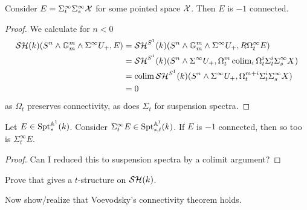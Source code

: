 \documentclass{amsart}%
\begin{document}
\begin{lemma}
  Consider $ E =\Sigma_t^{\infty}\Sigma_s^{\infty} \mathcal{X}$ for some pointed
  space $\mathcal{X}$. Then $E$ is $-1$ connected. 
\end{lemma}

\begin{proof}
  We calculate for $n<0$
  \begin{align*}
    \mathcal{SH}(k)(S^n\wedge\mathbb{G}_m^m \wedge \Sigma^{\infty}U_+, E) & = \mathcal{SH}^{S^1}(k)(S^n\wedge \mathbb{G}_m^m \wedge \Sigma^{\infty}U_+, R\Omega^{\infty}_tE) \\
    & = \mathcal{SH}^{S^1}(k)(S^n \wedge \Sigma^{\infty}U_+, \Omega_t^{m} \operatorname{colim}_i \Omega_t^i\Sigma_t^i \Sigma_s^{\infty} X)\\
    & = \operatorname{colim} \mathcal{SH}^{S^1}(k)(S^n \wedge \Sigma^{\infty}U_+, \Omega_t^{m+i}\Sigma_t^i \Sigma_s^{\infty} X)\\
      & = 0
  \end{align*}
  as $\Omega_t$ preserves connectivity, as does $\Sigma_t$ for
  suspension spectra.
\end{proof}

\begin{proposition}
  Let $E \in \mathrm{Spt}_s^{\mathbb{A}^1}(k)$. Consider
  $\Sigma^{\infty}_t E \in \mathrm{Spt}_{s,t}^{\mathbb{A}^1}(k)$. If $E$ is $-1$ connected,
  then so too is $\Sigma^{\infty}_t E$. 
\end{proposition}

\begin{proof}
  Can I reduced this to suspension spectra by a colimit argument? 
\end{proof}


Prove that \cite[Definition 5.2.1]{Mor03} gives a $t$-structure on
$\mathcal{SH}(k)$.

Now show/realize that Voevodsky's connectivity theorem holds. 
\end{document}
